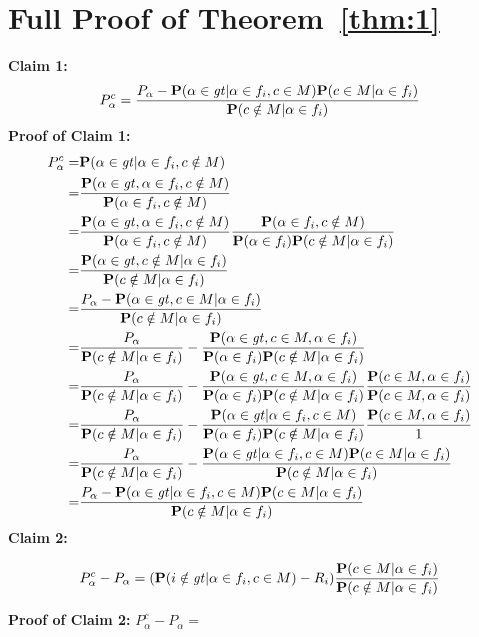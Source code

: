 \appendix
\section{Full Proof of Theorem~\ref{thm:1}}
\noindent\textbf{Claim 1:} \[
P_\alpha^{c}=\frac{P_\alpha-\Pr(\leg | \lefi, \c)\Pr(\c | \lefi)}{\Pr(\notc | \lefi)}
\]
\noindent\textbf{Proof of Claim 1:}
\begin{eqnarray*}
    P_\alpha^{c}=&\Pr(\alpha \in \gt | \alpha \in f_i,  c\notin \m)\\
    =&\frac{\Pr(\alpha \in \gt , \alpha \in f_i,  c\notin \m)}{\Pr(\alpha \in f_i,  c\notin \m)}\\
    =&\frac{\Pr(\alpha \in \gt , \alpha \in f_i,  c\notin \m)}{\Pr(\alpha \in f_i,  c\notin \m)}\frac{\Pr(\lefi,\notc)}{\Pr(\lefi)\Pr(\notc | \lefi)}\\
    =&\frac{\Pr(\alpha \in \gt, \notc | \lefi)}{\Pr(\notc | \lefi)}\\
    =&\frac{P_\alpha-\Pr(\alpha \in \gt, \c | \lefi)}{\Pr(\notc | \lefi)}\\
    =&\frac{P_\alpha}{\Pr(\notc | \lefi)}-\frac{\Pr(\alpha \in \gt, \c, \lefi)}{\Pr(\lefi)\Pr(\notc | \lefi)}\\
    =&\frac{P_\alpha}{\Pr(\notc | \lefi)}-\frac{\Pr(\alpha \in \gt, \c, \lefi)}{\Pr(\lefi)\Pr(\notc | \lefi)}\frac{\Pr(\c,\lefi)}{\Pr(\c,\lefi)}\\
    =&\frac{P_\alpha}{\Pr(\notc | \lefi)}-\frac{\Pr(\alpha \in \gt|  \lefi,\c)}{\Pr(\lefi)\Pr(\notc | \lefi)}\frac{\Pr(\c,\lefi)}{1}\\
    =&\frac{P_\alpha}{\Pr(\notc | \lefi)}-\frac{\Pr(\alpha \in \gt|  \lefi,\c)\Pr(\c|\lefi)}{\Pr(\notc | \lefi)}\\
    =&\frac{P_\alpha-\Pr(\alpha \in \gt|  \lefi,\c)\Pr(\c|\lefi)}{\Pr(\notc | \lefi)} 
\end{eqnarray*}
\noindent\textbf{Claim 2:} 
\begin{scriptsize}
\[
P_\alpha^{c}-P_\alpha=(\Pr(i \notin \gt | \lefi, \c)-R_i)\frac{\Pr(\c | \lefi)}{\Pr(\notc | \lefi)}
\]
\end{scriptsize}
\noindent\textbf{Proof of Claim 2:}
$P_\alpha^{c}-P_\alpha=$
